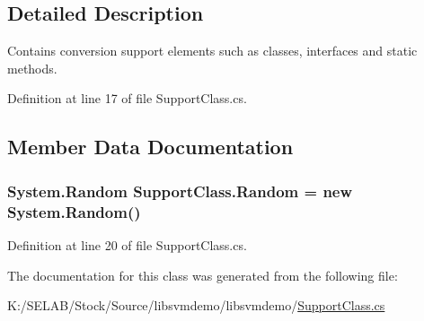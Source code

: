 \subsection{Detailed Description}
Contains conversion support elements such as classes, interfaces and static methods. 

Definition at line 17 of file SupportClass.cs.



\subsection{Member Data Documentation}
\hypertarget{class_support_class_a400708a790aaf598353d65616255452d}{
\subsubsection[{Random}]{\setlength{\rightskip}{0pt plus 5cm}System.Random {\bf SupportClass.Random} = new System.Random()}}
\label{class_support_class_a400708a790aaf598353d65616255452d}


Definition at line 20 of file SupportClass.cs.



The documentation for this class was generated from the following file:\begin{DoxyCompactItemize}
\item 
K:/SELAB/Stock/Source/libsvmdemo/libsvmdemo/\hyperlink{_support_class_8cs}{SupportClass.cs}\end{DoxyCompactItemize}
